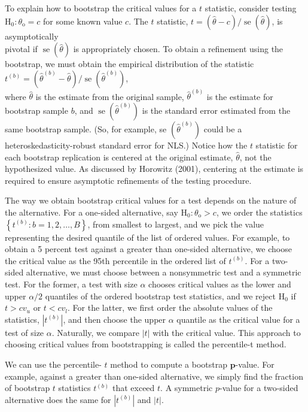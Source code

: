 \documentclass[10pt]{article}
\begin{document}
To explain how to bootstrap the critical values for a $t$ statistic, consider testing $\mathrm{H}_{0}: \theta_{\mathrm{o}}=c$ for some known value $c$. The $t$ statistic, $t=(\hat{\theta}-c) / \operatorname{se}(\hat{\theta})$, is asymptotically\\
pivotal if $\operatorname{se}(\hat{\theta})$ is appropriately chosen. To obtain a refinement using the bootstrap, we must obtain the empirical distribution of the statistic\\
$t^{(b)}=\left(\hat{\theta}^{(b)}-\hat{\theta}\right) / \operatorname{se}\left(\hat{\theta}^{(b)}\right)$,\\
where $\hat{\theta}$ is the estimate from the original sample, $\hat{\theta}^{(b)}$ is the estimate for bootstrap sample $b$, and $\operatorname{se}\left(\hat{\theta}^{(b)}\right)$ is the standard error estimated from the same bootstrap sample. (So, for example, se $\left(\hat{\theta}^{(b)}\right)$ could be a heteroskedasticity-robust standard error for NLS.) Notice how the $t$ statistic for each bootstrap replication is centered at the original estimate, $\hat{\theta}$, not the hypothesized value. As discussed by Horowitz (2001), centering at the estimate is required to ensure asymptotic refinements of the testing procedure.

The way we obtain bootstrap critical values for a test depends on the nature of the alternative. For a one-sided alternative, say $\mathrm{H}_{0}: \theta_{\mathrm{o}}>c$, we order the statistics $\left\{t^{(b)}: b=1,2, \ldots, B\right\}$, from smallest to largest, and we pick the value representing the desired quantile of the list of ordered values. For example, to obtain a 5 percent test against a greater than one-sided alternative, we choose the critical value as the 95th percentile in the ordered list of $t^{(b)}$. For a two-sided alternative, we must choose between a nonsymmetric test and a symmetric test. For the former, a test with size $\alpha$ chooses critical values as the lower and upper $\alpha / 2$ quantiles of the ordered bootstrap test statistics, and we reject $\mathrm{H}_{0}$ if $t>c v_{u}$ or $t<c v_{l}$. For the latter, we first order the absolute values of the statistics, $\left|t^{(b)}\right|$, and then choose the upper $\alpha$ quantile as the critical value for a test of size $\alpha$. Naturally, we compare $|t|$ with the critical value. This approach to choosing critical values from bootstrapping is called the percentile-t method.

We can use the percentile- $t$ method to compute a bootstrap $\boldsymbol{p}$-value. For example, against a greater than one-sided alternative, we simply find the fraction of bootstrap $t$ statistics $t^{(b)}$ that exceed $t$. A symmetric $p$-value for a two-sided alternative does the same for $\left|t^{(b)}\right|$ and $|t|$.
\end{document}
